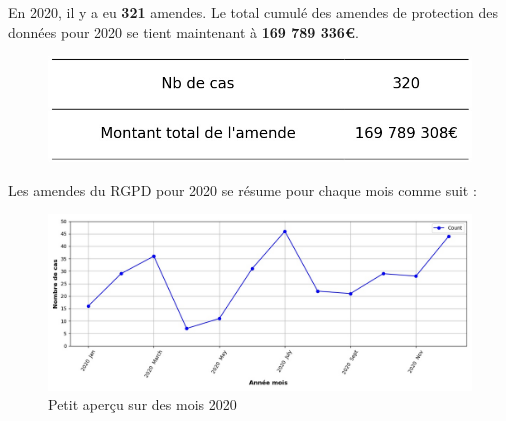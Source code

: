 \documentclass[french]{article}
\begin{document}
\newpage




	\begin{multicols}{2}
	
	En 2020,  il y a eu \textbf{321} amendes.
	Le total cumulé des amendes de protection des données pour 2020 se tient maintenant à \textbf{169 789 336€}.
	
	\begin{figure}[H]
	\centering\includegraphics[width=1\linewidth]{graphs/counter_year}
	\end{figure}


	Les amendes du RGPD pour 2020 se résume pour chaque mois comme suit :

	\begin{figure}
	[H]\centering\includegraphics[width = 1.2\linewidth]{graphs/NbFinesPerMonth_year_graph}
	\caption{Petit aperçu sur des mois 2020}
	\end{figure}

	\end{multicols}
\end{document}
